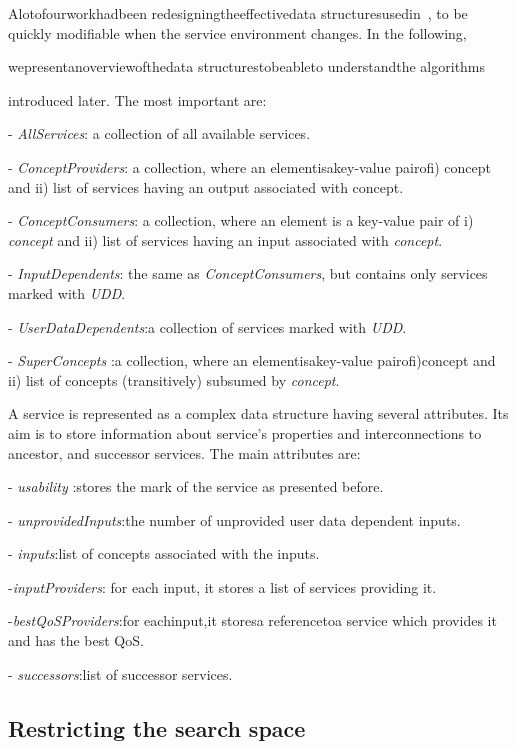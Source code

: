 \documentclass{llncs}
\begin{document}
Alotofourworkhadbeen redesigningtheeffectivedata structuresusedin~\cite{4,5}, 
to be quickly modifiable when the service environment changes. In the following, 


wepresentanoverviewofthedata structurestobeableto understandthe algorithms 

introduced later. The most important are: 

 - \textit{AllServices}: a collection of all available services. 

- \textit{ConceptProviders}: a collection, where an elementisakey-value pairofi) concept 
and ii) list of services having an output associated with concept. 

- \textit{ConceptConsumers}: a collection, where an element is a key-value pair of i) 
 \textit{concept} and ii) list of services having an input associated with \textit{ concept}. 

- \textit{InputDependents}: the same as\textit{ ConceptConsumers}, but contains only services 
marked with \textit{ UDD}. 

- \textit{UserDataDependents}:a collection of services marked with \textit{UDD}. 

- \textit{SuperConcepts} :a collection, where an elementisakey-value pairofi)concept 
and ii) list of concepts (transitively) subsumed by \textit{ concept}. 

A service is represented as a complex data structure having several attributes. 
Its aim is to store information about service’s properties and interconnections to 
ancestor, and successor services. The main attributes are: 

- \textit{usability} :stores the mark of the service as presented before. 

- \textit{unprovidedInputs}:the number of unprovided user data dependent inputs. 

- \textit{inputs}:list of concepts associated with the inputs. 

-\textit{inputProviders}: for each input, it stores a list of services providing it. 

-\textit{bestQoSProviders}:for eachinput,it storesa referencetoa service which provides 
it and has the best QoS. 

- \textit{successors}:list of successor services. 

\subsection{Restricting the search space }
\end{document}
